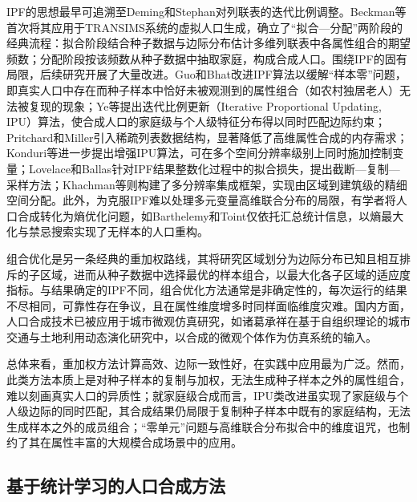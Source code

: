 IPF的思想最早可追溯至Deming和Stephan\citep{demingLeastSquaresAdjustment1940}对列联表的迭代比例调整。Beckman等\citep{beckmanCreatingSyntheticBaseline1996}首次将其应用于TRANSIMS系统的虚拟人口生成，确立了``拟合—分配''两阶段的经典流程：拟合阶段结合种子数据与边际分布估计多维列联表中各属性组合的期望频数；分配阶段按该频数从种子数据中抽取家庭，构成合成人口。围绕IPF的固有局限，后续研究开展了大量改进。Guo和Bhat\citep{guoPopulationSynthesisMicrosimulating2007}改进IPF算法以缓解``样本零''问题，即真实人口中存在而种子样本中恰好未被观测到的属性组合（如农村独居老人）无法被复现的现象；Ye等\citep{yeMethodologyMatchDistributions2009}提出迭代比例更新（Iterative Proportional Updating, IPU）算法，使合成人口的家庭级与个人级特征分布得以同时匹配边际约束；Pritchard和Miller\citep{pritchardAdvancesPopulationSynthesis2012}引入稀疏列表数据结构，显著降低了高维属性合成的内存需求；Konduri等\citep{konduriEnhancedSyntheticPopulation2016}进一步提出增强IPU算法，可在多个空间分辨率级别上同时施加控制变量；Lovelace和Ballas\citep{lovelaceTruncateReplicateSample2013}针对IPF结果整数化过程中的拟合损失，提出截断—复制—采样方法；Khachman等\citep{khachmanIntegratedMultiresolutionFramework2024}则构建了多分辨率集成框架，实现由区域到建筑级的精细空间分配。此外，为克服IPF难以处理多元变量高维联合分布的局限，有学者将人口合成转化为熵优化问题，如Barthelemy和Toint\citep{barthelemySyntheticPopulationGeneration2013}仅依托汇总统计信息，以熵最大化与禁忌搜索实现了无样本的人口重构。

组合优化是另一条经典的重加权路线，其将研究区域划分为边际分布已知且相互排斥的子区域，进而从种子数据中选择最优的样本组合，以最大化各子区域的适应度指标\citep{voasEvaluationCombinatorialOptimisation2000}。与结果确定的IPF不同，组合优化方法通常是非确定性的，每次运行的结果不尽相同，可靠性存在争议，且在属性维度增多时同样面临维度灾难。国内方面，人口合成技术已被应用于城市微观仿真研究，如诸葛承祥\citep{ZhuGeChengXiangJiYuZiZuZhiLiLunDeChengShiJiaoTongHeTuDiLiYongDongTaiYanHuaJiLiYanJiu2014}在基于自组织理论的城市交通与土地利用动态演化研究中，以合成的微观个体作为仿真系统的输入。

总体来看，重加权方法计算高效、边际一致性好，在实践中应用最为广泛。然而，此类方法本质上是对种子样本的复制与加权，无法生成种子样本之外的属性组合，难以刻画真实人口的异质性；就家庭级合成而言，IPU类改进虽实现了家庭级与个人级边际的同时匹配，其合成结果仍局限于复制种子样本中既有的家庭结构，无法生成样本之外的成员组合；``零单元''问题与高维联合分布拟合中的维度诅咒，也制约了其在属性丰富的大规模合成场景中的应用\citep{laPopulationSynthesisProblembased2025}。

\subsection{基于统计学习的人口合成方法}\label{subsec.review.popsyn.dgm}

